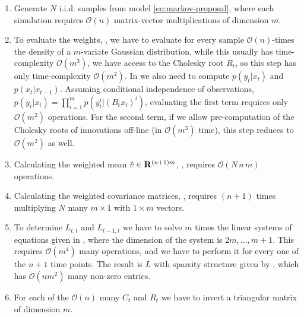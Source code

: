 \begin{enumerate}
    \item[\Cref{step:cem-simulate}] Generate $N$ i.i.d. samples from model \eqref{eq:markov-proposal}, where each simulation requires $\mathcal O(n)$ matrix-vector multiplications of dimension $m$. 
    \item[\Cref{step:cem-weights}] To evaluate the weights, , we have to evaluate for every sample $\mathcal O(n)$-times the density of a $m$-variate Gaussian distribution, while this usually has time-complexity $\mathcal O(m^{3})$, we have access to the Cholesky root $R_{t}$, so this step has only time-complexity $\mathcal O(m^{2})$. In  we also need to compute $p(y_{t}|x_{t})$ and $p(x_{t}|x_{t - 1})$. Assuming conditional independence of observations, $p(y_{t}|x_{t}) = \prod_{i = 1}^{m}p(y_{t}^i|(B_{t}x_{t})^{i})$, evaluating the first term requires only $\mathcal O(m^{2})$ operations. For the second term, if we allow pre-computation of the Cholesky roots of innovations off-line (in $\mathcal O(m^{3})$ time), this step reduces to $\mathcal O(m^{2})$ as well.  
    \item[\Cref{step:cem-est_v}] Calculating the weighted mean $\hat v \in\mathbf R^{(n+1)m}$, , requires $\mathcal O(N\,n\,m)$ operations.
    \item[\Cref{step:cem-est_cov}] Calculating the weighted covariance matrices, , requires $(n+1)$ times multiplying $N$ many $m\times 1$ with $1 \times m$ vectors. 
    \item[\Cref{step:cem-L}] To determine $L_{t,t}$ and $L_{t - 1, t}$ we have to solve $m$ times the linear systems of equations given in , where the dimension of the system is $2m,\dots, m + 1$. This requires $\mathcal O(m^{4})$ many operations, and we have to perform it for every one of the $n + 1$ time points. The result is $L$ with sparsity structure given by , which has $\mathcal O (n m^{2})$ many non-zero entries.
    \item[\Cref{step:cem-C_R}] For each of the $\mathcal O(n)$ many $C_{t}$ and $R_{t}$ we have to invert a triangular matrix of dimension $m$. 
\end{enumerate}

